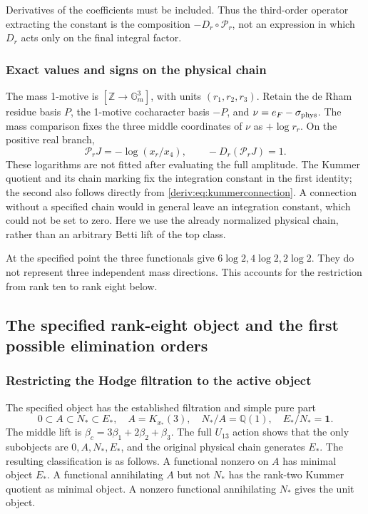 \documentclass[11pt,a4paper,oneside]{article}
\theoremstyle{plain}
\theoremstyle{definition}
\theoremstyle{remark}
\newcommand{\Q}{\mathbb Q}
\numberwithin{equation}{section}
\begin{document}
Derivatives of the coefficients must be included. Thus the third-order operator extracting the constant is the composition $-D_r\circ\mathscr P_r$, not an expression in which $D_r$ acts only on the final integral factor.

\subsubsection{Exact values and signs on the physical chain}
The mass 1-motive is $[\mathbb Z\to\mathbb G_m^3]$, with units $(r_1,r_2,r_3)$. Retain the de Rham residue basis $P$, the 1-motive cocharacter basis $-P$, and $\nu=e_F-\sigma_{\rm phys}$. The mass comparison fixes the three middle coordinates of $\nu$ as $+\log r_r$. On the positive real branch,
\begin{equation}\label{deriv:eq:physicalextract}
 \boxed{\mathscr P_rJ=-\log(x_r/x_4),\qquad
       -D_r(\mathscr P_rJ)=1.}
\end{equation}
These logarithms are not fitted after evaluating the full amplitude. The Kummer quotient and its chain marking fix the integration constant in the first identity; the second also follows directly from \eqref{deriv:eq:kummerconnection}. A connection without a specified chain would in general leave an integration constant, which could not be set to zero. Here we use the already normalized physical chain, rather than an arbitrary Betti lift of the top class.

At the specified point the three functionals give $6\log2,4\log2,2\log2$. They do not represent three independent mass directions. This accounts for the restriction from rank ten to rank eight below.

\subsection{The specified rank-eight object and the first possible elimination orders}
\subsubsection{Restricting the Hodge filtration to the active object}
The specified object has the established filtration and simple pure part
\begin{equation}\label{deriv:eq:active}
 0\subset A\subset N_*\subset E_*,\quad
 A=K_{x_*}(3),\quad N_*/A=\Q(1),\quad E_*/N_*=\mathbf1.
\end{equation}
The middle lift is $\beta_c=3\beta_1+2\beta_2+\beta_3$. The full $U_{13}$ action shows that the only subobjects are $0,A,N_*,E_*$, and the original physical chain generates $E_*$. The resulting classification is as follows. A functional nonzero on $A$ has minimal object $E_*$. A functional annihilating $A$ but not $N_*$ has the rank-two Kummer quotient as minimal object. A nonzero functional annihilating $N_*$ gives the unit object.
\end{document}
